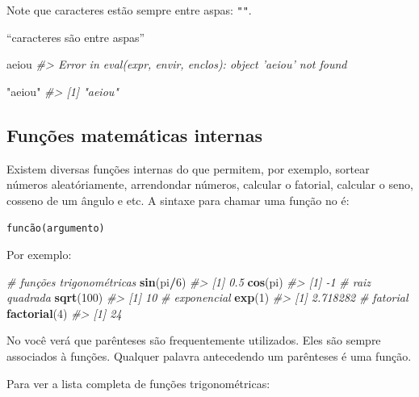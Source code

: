 \documentclass[]{book}
\newenvironment{Shaded}{\begin{snugshade}}{\end{snugshade}}
\newcommand{\KeywordTok}[1]{\textcolor[rgb]{0.13,0.29,0.53}{\textbf{#1}}}
\newcommand{\DecValTok}[1]{\textcolor[rgb]{0.00,0.00,0.81}{#1}}
\newcommand{\StringTok}[1]{\textcolor[rgb]{0.31,0.60,0.02}{#1}}
\newcommand{\CommentTok}[1]{\textcolor[rgb]{0.56,0.35,0.01}{\textit{#1}}}
\newcommand{\OperatorTok}[1]{\textcolor[rgb]{0.81,0.36,0.00}{\textbf{#1}}}
\newcommand{\NormalTok}[1]{#1}
\begin{document}
Note que caracteres estão sempre entre aspas: \texttt{""}.

``caracteres são entre aspas''

\begin{Shaded}
\begin{Highlighting}[]
\NormalTok{aeiou}
\CommentTok{#> Error in eval(expr, envir, enclos): object 'aeiou' not found}
\end{Highlighting}
\end{Shaded}

\begin{Shaded}
\begin{Highlighting}[]
\StringTok{"aeiou"}
\CommentTok{#> [1] "aeiou"}
\end{Highlighting}
\end{Shaded}

\subsection{Funções matemáticas
internas}\label{funcoes-matematicas-internas}

Existem diversas funções internas do que permitem, por exemplo, sortear
números aleatóriamente, arrendondar números, calcular o fatorial,
calcular o seno, cosseno de um ângulo e etc. A sintaxe para chamar uma
função no é:

\texttt{funcão(argumento)}

Por exemplo:

\begin{Shaded}
\begin{Highlighting}[]
\CommentTok{# funções trigonométricas}
\KeywordTok{sin}\NormalTok{(pi}\OperatorTok{/}\DecValTok{6}\NormalTok{)}
\CommentTok{#> [1] 0.5}
\KeywordTok{cos}\NormalTok{(pi)}
\CommentTok{#> [1] -1}
\CommentTok{# raiz quadrada}
\KeywordTok{sqrt}\NormalTok{(}\DecValTok{100}\NormalTok{)}
\CommentTok{#> [1] 10}
\CommentTok{# exponencial}
\KeywordTok{exp}\NormalTok{(}\DecValTok{1}\NormalTok{)}
\CommentTok{#> [1] 2.718282}
\CommentTok{# fatorial}
\KeywordTok{factorial}\NormalTok{(}\DecValTok{4}\NormalTok{)}
\CommentTok{#> [1] 24}
\end{Highlighting}
\end{Shaded}

No você verá que parênteses são frequentemente utilizados. Eles são
sempre associados à funções. Qualquer palavra antecedendo um parênteses
é uma função.

Para ver a lista completa de funções trigonométricas:
\end{document}
